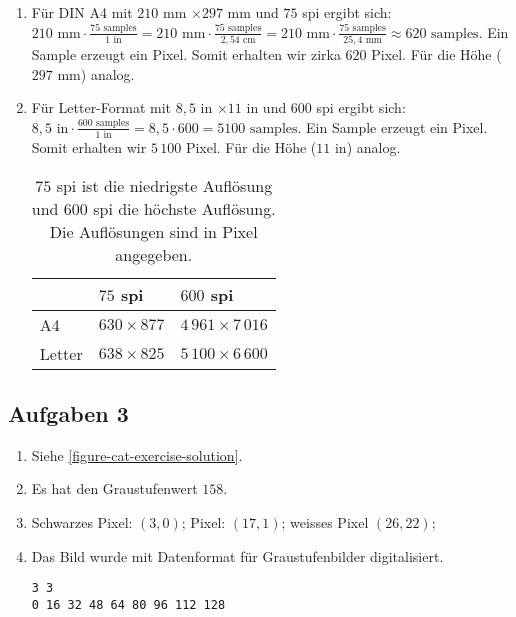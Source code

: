 \begin{enumerate}
\item Für DIN A4 mit $210$ mm $\times 297$ mm und $75$ spi ergibt sich: \\
$210\text{~mm}\cdot\frac{75\text{~samples}}{1\text{~in}} = 210\text{~mm}\cdot\frac{75\text{~samples}}{2,54\text{~cm}} = 210\text{~mm}\cdot\frac{75\text{~samples}}{25,4\text{~mm}} \approx 620\text{~samples}$. Ein Sample erzeugt ein Pixel. Somit erhalten wir zirka $620$ Pixel. Für die Höhe ($297$ mm) analog.
\item Für Letter-Format mit $8,5$ in $\times 11$ in und $600$ spi ergibt sich: \\
$8,5\text{~in}\cdot\frac{600\text{~samples}}{1\text{~in}} = 8,5 \cdot 600 = 5100 \text{~samples}$. Ein Sample erzeugt ein Pixel. Somit erhalten wir $5\,100$ Pixel. Für die Höhe ($11$ in) analog.

\begin{table}[htb]
\centering
\begin{tabular}{|l|l|l|}
\hline
       & $75$ spi & $600$ spi \\ \hline
A4     & $630 \times 877$ & $4\,961 \times 7\,016$ \\ \hline
Letter & $638 \times 825$ & $5\,100 \times 6\,600$       \\ \hline
\end{tabular}
\caption{$75$ spi ist die niedrigste Auflösung und $600$ spi die höchste Auflösung. Die Auflösungen sind in Pixel angegeben.}
\label{table-scan-exercise-result}
\end{table}

\end{enumerate}

\subsection*{Aufgaben 3}

\begin{enumerate}
\item Siehe \autoref{figure-cat-exercise-solution}.
\item Es hat den Graustufenwert $158$.
\item Schwarzes Pixel: $(3, 0)$;  Pixel: $(17, 1)$; weisses Pixel $(26, 22)$;
\item Das Bild wurde mit  Datenformat für Graustufenbilder digitalisiert.
\begin{verbatim}
3 3
0 16 32 48 64 80 96 112 128
\end{verbatim}
\end{enumerate}

